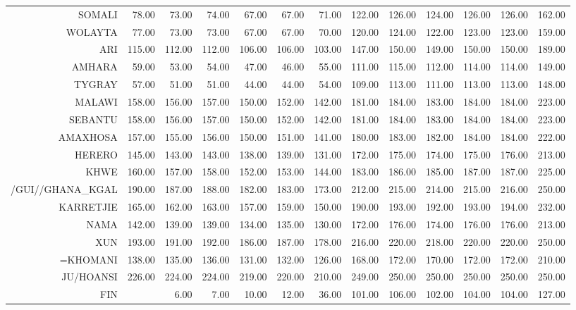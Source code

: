 \begin{longtable}{rrrrrrrrrrrrr}
  SOMALI & 78.00 & 73.00 & 74.00 & 67.00 & 67.00 & 71.00 & 122.00 & 126.00 & 124.00 & 126.00 & 126.00 & 162.00 \\ 
  WOLAYTA & 77.00 & 73.00 & 73.00 & 67.00 & 67.00 & 70.00 & 120.00 & 124.00 & 122.00 & 123.00 & 123.00 & 159.00 \\ 
  ARI & 115.00 & 112.00 & 112.00 & 106.00 & 106.00 & 103.00 & 147.00 & 150.00 & 149.00 & 150.00 & 150.00 & 189.00 \\ 
  AMHARA & 59.00 & 53.00 & 54.00 & 47.00 & 46.00 & 55.00 & 111.00 & 115.00 & 112.00 & 114.00 & 114.00 & 149.00 \\ 
  TYGRAY & 57.00 & 51.00 & 51.00 & 44.00 & 44.00 & 54.00 & 109.00 & 113.00 & 111.00 & 113.00 & 113.00 & 148.00 \\ 
   \hline 
MALAWI & 158.00 & 156.00 & 157.00 & 150.00 & 152.00 & 142.00 & 181.00 & 184.00 & 183.00 & 184.00 & 184.00 & 223.00 \\ 
  SEBANTU & 158.00 & 156.00 & 157.00 & 150.00 & 152.00 & 142.00 & 181.00 & 184.00 & 183.00 & 184.00 & 184.00 & 223.00 \\ 
  AMAXHOSA & 157.00 & 155.00 & 156.00 & 150.00 & 151.00 & 141.00 & 180.00 & 183.00 & 182.00 & 184.00 & 184.00 & 222.00 \\ 
  HERERO & 145.00 & 143.00 & 143.00 & 138.00 & 139.00 & 131.00 & 172.00 & 175.00 & 174.00 & 175.00 & 176.00 & 213.00 \\ 
   \hline 
KHWE & 160.00 & 157.00 & 158.00 & 152.00 & 153.00 & 144.00 & 183.00 & 186.00 & 185.00 & 187.00 & 187.00 & 225.00 \\ 
  /GUI//GHANA\_KGAL & 190.00 & 187.00 & 188.00 & 182.00 & 183.00 & 173.00 & 212.00 & 215.00 & 214.00 & 215.00 & 216.00 & 250.00 \\ 
  KARRETJIE & 165.00 & 162.00 & 163.00 & 157.00 & 159.00 & 150.00 & 190.00 & 193.00 & 192.00 & 193.00 & 194.00 & 232.00 \\ 
  NAMA & 142.00 & 139.00 & 139.00 & 134.00 & 135.00 & 130.00 & 172.00 & 176.00 & 174.00 & 176.00 & 176.00 & 213.00 \\ 
  XUN & 193.00 & 191.00 & 192.00 & 186.00 & 187.00 & 178.00 & 216.00 & 220.00 & 218.00 & 220.00 & 220.00 & 250.00 \\ 
  =KHOMANI & 138.00 & 135.00 & 136.00 & 131.00 & 132.00 & 126.00 & 168.00 & 172.00 & 170.00 & 172.00 & 172.00 & 210.00 \\ 
  JU/HOANSI & 226.00 & 224.00 & 224.00 & 219.00 & 220.00 & 210.00 & 249.00 & 250.00 & 250.00 & 250.00 & 250.00 & 250.00 \\ 
   \hline 
FIN &  & 6.00 & 7.00 & 10.00 & 12.00 & 36.00 & 101.00 & 106.00 & 102.00 & 104.00 & 104.00 & 127.00 \\ 

\end{longtable}
